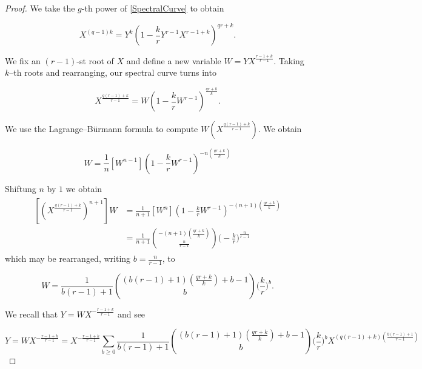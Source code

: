 \documentclass[10pt,a4paper,oneside,no-math,reqno]{amsart}%
\theoremstyle{plain}
\theoremstyle{definition}
\theoremstyle{remark}
\numberwithin{equation}{section}
\newcommand{\1}{\mathds{1}}
\newcommand{\<}{\langle}
\renewcommand{\>}{\rangle}
\begin{document}
\begin{proof}
    We take the $g$-th power of \cref{SpectralCurve} to obtain

    \begin{equation}
        X^{(q-1)k}
        =
        Y^k(1-\frac{k}{r}Y^{r-1}X^{r-1+k})^{qr+k}.
    \end{equation}

   We fix an $(r-1)$-st root of $ X$ and define a new variable $W=YX^{\frac{r-1+k}{r-1}}$. Taking $k$--th roots and rearranging, our spectral curve turns into

   \begin{equation}
       X^{\frac{q(r-1)+k}{r-1}}
       =
       W(1-\frac{k}{r} W^{r-1})^{\frac{qr+k}{k}}.
   \end{equation}

    We use the Lagrange--Bürmann formula to compute $W(X^{\frac{q(r-1)+k}{r-1}})$. We obtain
    
    \begin{equation}
        [(X^{\frac{q(r-1)+k}{r-1}})^n]W
        =
        \frac{1}{n}[W^{n-1}]\left(1-\frac{k}{r}W^{r-1} \right)^{-n\left(\frac{qr+k}{k}\right)}
    \end{equation}

    Shiftung $n$ by $1$ we obtain
    \begin{align}
        \begin{split}
            [(X^{\frac{q(r-1)+k}{r-1}})^{n+1}]W
            &=
            \frac{1}{n+1}[W^{n}]\left(1-\frac{k}{r} W^{r-1} \right)^{-(n+1)\left(\frac{qr+k}{k}\right)}
            \\
            &=
            \frac{1}{n+1}\binom{-(n+1)\left(\frac{qr+k}{k}\right)}{\frac{n}{r-1}}\Big(-\frac{k}{r}\Big)^{\frac{n}{r-1}}
        \end{split}
    \end{align}
    which may be rearranged, writing $ b = \frac{n}{r-1}$, to
    
    \begin{equation}
        [(X^{q(r-1)+k})^{b+\frac{1}{r-1}}]W
        =
        \frac{1}{b(r-1)+1}\binom{(b(r-1)+1)\left(\frac{qr+k}{k}\right)+b-1}{b} \Big(\frac{k}{r}\Big)^b.
    \end{equation}


    We recall that $Y = W X^{-\frac{r-1+k}{r-1}}$ and see

    \begin{equation}
        Y
        =
        W X^{-\frac{r-1+k}{r-1}}
        =
        X^{-\frac{r-1+k}{r-1}}\sum_{b\ge0}\frac{1}{b(r-1)+1}\binom{(b(r-1)+1)\left(\frac{qr+k}{k}\right)+b-1}{b}\Big(\frac{k}{r}\Big)^b X^{(q(r-1)+k)(\frac{b(r-1)+1}{r-1})}
    \end{equation}


\end{proof}
\end{document}
